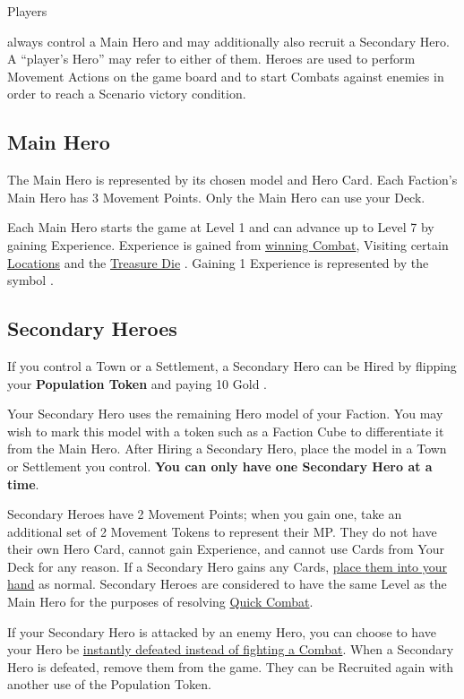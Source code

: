 
\begin{multicols*}{2}

\hypertarget{Heroes}{Players} always control a Main Hero and may additionally also recruit a Secondary Hero.
A “player's Hero” may refer to either of them.
Heroes are used to perform Movement Actions on the game board and to start Combats against enemies in order to reach a Scenario victory condition.

\subsection*{Main Hero}
The Main Hero is represented by its chosen model and Hero Card.
Each Faction's Main Hero has 3 Movement Points.
Only the Main Hero can use your Deck.\par
Each Main Hero starts the game at Level 1 and can advance up to Level 7 by gaining Experience.
Experience is gained from \hyperlink{Combatexperience}{winning Combat}, Visiting certain \hyperlink{All}{Locations} and the \hyperlink{Resources}{Treasure Die} .
Gaining 1 Experience is represented by the symbol .

\subsection*{\hypertarget{Secondary}{Secondary Heroes}}
If you control a Town or a Settlement, a Secondary Hero can be Hired by flipping your \textbf{Population Token} and paying 10 Gold .\par
{}\par
Your Secondary Hero uses the remaining Hero model of your Faction.
You may wish to mark this model with a token such as a Faction Cube to differentiate it from the Main Hero.
After Hiring a Secondary Hero, place the model in a Town or Settlement you control.
\textbf{You can only have one Secondary Hero at a time}.\par
Secondary Heroes have 2 Movement Points; when you gain one, take an additional set of 2 Movement Tokens to represent their MP.
They do not have their own Hero Card, cannot gain Experience, and cannot use Cards from Your Deck for any reason.
If a Secondary Hero gains any Cards, \hyperlink{Playerdecks}{place them into your hand} as normal.
Secondary Heroes are considered to have the same Level as the Main Hero for the purposes of resolving \hyperlink{Quick}{Quick Combat}.\par
If your Secondary Hero is attacked by an enemy Hero, you can choose to have your Hero be \hyperlink{Endcombat}{instantly defeated instead of fighting a Combat}.
When a Secondary Hero is defeated, remove them from the game.
They can be Recruited again with another use of the Population Token.\par


\end{multicols*}
